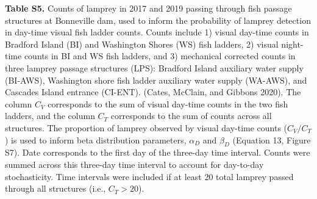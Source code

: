 \documentclass[
]{article}
\begin{document}
\textbf{Table S5.} Counts of lamprey in 2017 and 2019 passing through
fish passage structures at Bonneville dam, used to inform the
probability of lamprey detection in day-time visual fish ladder counts.
Counts include 1) visual day-time counts in Bradford Island (BI) and
Washington Shores (WS) fish ladders, 2) visual night-time counts in BI
and WS fish ladders, and 3) mechanical corrected counts in three lamprey
passage structures (LPS): Bradford Island auxiliary water supply
(BI-AWS), Washington shore fish ladder auxiliary water supply (WA-AWS),
and Cascades Island entrance (CI-ENT). (Cates, McClain, and Gibbons
2020). The column \(C_V\) corresponds to the sum of visual day-time
counts in the two fish ladders, and the column \(C_T\) corresponds to
the sum of counts across all structures. The proportion of lamprey
observed by visual day-time counts (\(C_V / C_T\)) is used to inform
beta distribution parameters, \(\alpha_D\) and \(\beta_D\) (Equation 13,
Figure S7). Date corresponds to the first day of the three-day time
interval. Counts were summed across this three-day time interval to
account for day-to-day stochasticity. Time intervals were included if at
least 20 total lamprey passed through all structures (i.e.,
\(C_T > 20\)).
\end{document}
